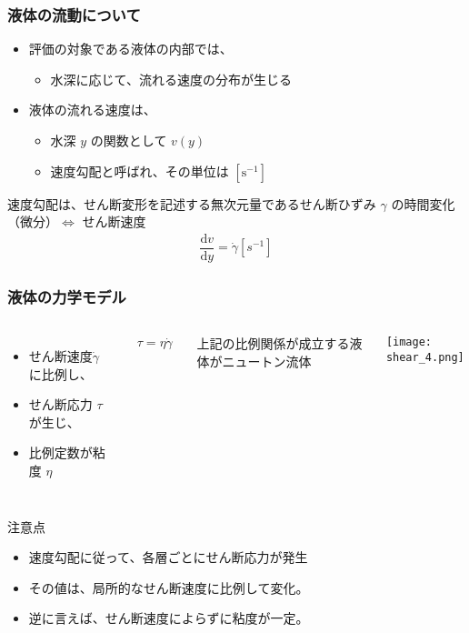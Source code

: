 \documentclass[12pt, dvipdfmx]{beamer}
\begin{document}
\begin{frame}
	\frametitle{液体の流動について}
		\begin{itemize}
			\item 評価の対象である液体の内部では、
			\begin{itemize}
				\item 水深に応じて、流れる速度の分布が生じる
			\end{itemize}
			\item 液体の流れる速度は、
			\begin{itemize}
				\item 水深 $y$ の関数として $v(y)$
				\item 速度勾配と呼ばれ、その単位は $[\mathrm{s^{-1}}]$
			\end{itemize}
		\end{itemize}
		\begin{screen}
			速度勾配は、せん断変形を記述する無次元量であるせん断ひずみ $\gamma$ の時間変化（微分）$\Leftrightarrow$ せん断速度
			\begin{align*}
				\dfrac{\mathrm{d} v}{\mathrm{d} y} =\dot{\gamma} [s^{-1}]
			\end{align*}
		\end{screen}
\end{frame}

\begin{frame}
	\frametitle{液体の力学モデル}
	\vspace{-3mm}
		\begin{columns}[c, onlytextwidth]
				\begin{itemize}
					\item せん断速度$\dot{\gamma}$ に比例し、
					\item せん断応力 $\tau$ が生じ、
					\item 比例定数が粘度 $\eta$
				\end{itemize}
				\vspace{-2mm}
				\begin{align*}
					\tau = \eta \dot{\gamma}
				\end{align*}
				\vspace{-6mm}
				\begin{screen}
					上記の比例関係が成立する液体がニュートン流体
				\end{screen}
				\begin{center}
					\texttt{[image: shear\_4.png]}
				\end{center}
		\end{columns}
		\begin{alertblock}{注意点}
			\begin{itemize}
				\item 速度勾配に従って、各層ごとにせん断応力が発生
				\item その値は、\alert{局所的なせん断速度に比例して変化。}
				\item 逆に言えば、\alert{せん断速度によらずに粘度が一定。}
			\end{itemize}
		\end{alertblock}
\end{frame}
\end{document}
